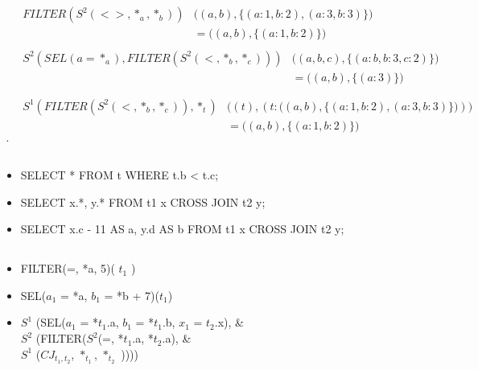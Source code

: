 \documentclass[a4paper]{article}
\begin{document}
	\subsection{}
	\begin{align}
		&\begin{aligned}
			FILTER(S^2(<>, *_{a}, *_{b})) &\big((a, b), \{(a: 1, b: 2), (a: 3,
			b: 3)\}\big) \\
										  &= \big( (a, b), \{(a: 1, b: 2)\} \big)
		\end{aligned} \\
		&\begin{aligned}
			S^{2}(SEL(a = *_{a}), FILTER(S^{2}(<, *_{b}, *_{c}))) &\big((a, b,
			c), \{(a: b, b: 3, c: 2)\}\big) \\
																	 &= \big((a, b),
																		 \{(a:
																		 3)\}) \\
		\end{aligned} \\
		&\begin{aligned}
			S^1(FILTER(S^2(<, *_{b}, *_{c})), *_{t}) &\Big((t), {(t: \big((a, b),
			\{(a: 1, b: 2), (a: 3, b: 3)\}\big))}\Big) \\
													 &= \big((a, b), \{(a: 1, b: 2)\}\big)
		\end{aligned} \\
	.\end{align}
	\subsection{}
	\begin{itemize}
		\item SELECT * FROM t WHERE t.b < t.c;
		\item SELECT x.*, y.* FROM t1 x CROSS JOIN t2 y;
		\item SELECT x.c - 11 AS a, y.d AS b FROM t1 x CROSS JOIN t2 y;
	\end{itemize}
	\subsection{}
	\begin{itemize}
		\item FILTER(=, *a, 5)( $t_1$ )
		\item SEL($a_1$ = *a, $b_1$ = *b + 7)($t_1$)
		\item \begin{aligned}
				$S^1$ (SEL($a_1$ = *$t_1$.a, $b_1$ = *$t_1$.b, $x_1$ = $t_2$.x),
				&\\
				$S^2$ (FILTER($S^2$(=, *$t_1$.a, *$t_2$.a), & \\
				$S^1$ ($CJ_{t_1, t_2}$, $*_{t_1}$, $*_{t_2}$ ))))
			\end{aligned}
	\end{itemize}
\end{document}

